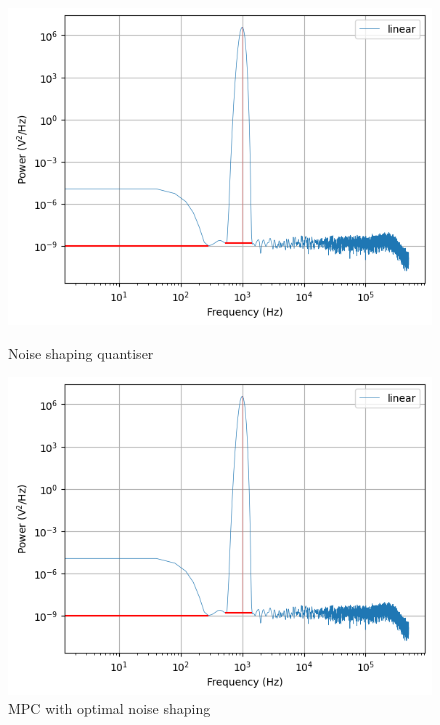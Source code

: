 \documentclass[a4paper]{article}
\begin{document}
\begin{figure}[!h]
	\centering
	\begin{minipage}{0.5\linewidth}
		\centering
		\includegraphics[scale = 0.6]{mat_plots/psd_plots/nsd.png}
		\caption{Noise shaping quantiser}
        \label{fig:nsd_psd}
	\end{minipage}
	\hfil
	\begin{minipage}{0.45\linewidth}
		\centering
		\includegraphics[scale = 0.6]{mat_plots/psd_plots/mpc.png}
		\caption{MPC with optimal noise shaping}
   \label{fig:mpc_psd}
	\end{minipage}
\end{figure}
\end{document}
